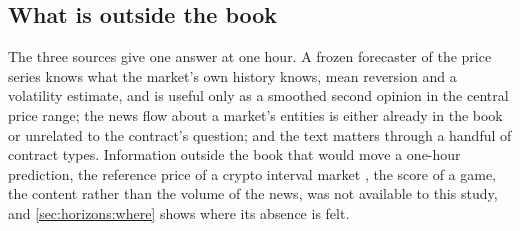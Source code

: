 \subsection{What is outside the book}

The three sources give one answer at one hour.  A frozen forecaster of the price series
knows what the market's own history knows, mean reversion and a volatility estimate, and is
useful only as a smoothed second opinion in the central price range; the news flow about a
market's entities is either already in the book or unrelated to the contract's question; and
the text matters through a handful of contract types.  Information outside the book that
would move a one-hour prediction, the reference price of a crypto interval market
\cite{young2026openmarket}, the score of a game, the content rather than the volume of the
news, was not available to this study, and \cref{sec:horizons:where} shows where its absence
is felt.
